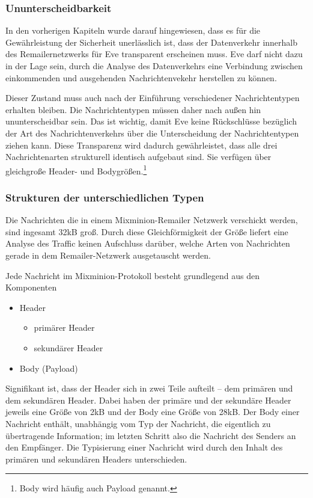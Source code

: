\subsubsection{Ununterscheidbarkeit}
In den vorherigen Kapiteln wurde darauf hingewiesen, dass es für die Gewährleistung der Sicherheit unerlässlich ist, dass der Datenverkehr innerhalb des Remailernetzwerks für Eve transparent erscheinen muss. Eve darf nicht dazu in der Lage sein, durch die Analyse des Datenverkehrs eine Verbindung zwischen einkommenden und ausgehenden Nachrichtenvekehr herstellen zu können.

Dieser Zustand muss auch nach der Einführung verschiedener Nachrichtentypen erhalten bleiben.  Die Nachrichtentypen müssen daher nach außen hin ununterscheidbar sein. Das ist wichtig, damit Eve keine Rückschlüsse bezüglich der Art des Nachrichtenverkehrs über die Unterscheidung der Nachrichtentypen ziehen kann. Diese Transparenz wird dadurch gewährleistet, dass alle drei Nachrichtenarten strukturell identisch aufgebaut sind. Sie verfügen über gleichgroße Header- und Bodygrößen.\footnote{Body wird häufig auch Payload genannt.}

\subsubsection{Strukturen der unterschiedlichen Typen}
Die Nachrichten die in einem Mixminion-Remailer Netzwerk verschickt werden, sind ingesamt 32kB groß. Durch diese Gleichförmigkeit der Größe liefert eine Analyse des Traffic keinen Aufschluss darüber, welche Arten von Nachrichten gerade in dem Remailer-Netzwerk ausgetauscht werden.

Jede Nachricht im Mixminion-Protokoll besteht grundlegend aus den Komponenten 
\begin{itemize}
\item Header
	\begin{itemize}
	\item primärer Header
	\item sekundärer Header
	\end{itemize}
\item Body (Payload)
\end{itemize}

Signifikant ist, dass der Header sich in zwei Teile aufteilt -- dem primären und dem sekundären Header. Dabei haben der primäre und der sekundäre Header jeweils eine Größe von 2kB und der Body eine Größe von 28kB. Der Body einer Nachricht enthält, unabhängig vom Typ der Nachricht, die eigentlich zu übertragende Information; im letzten Schritt also die Nachricht des Senders an den Empfänger. Die Typisierung einer Nachricht wird durch den Inhalt des primären und sekundären Headers unterschieden.

